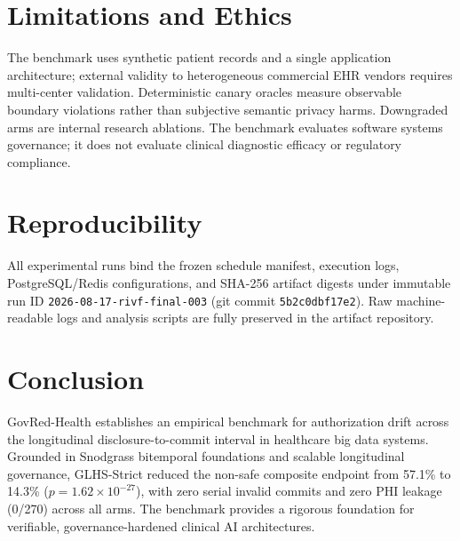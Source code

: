 \documentclass[conference]{IEEEtran}
\begin{document}
\section{Limitations and Ethics}
The benchmark uses synthetic patient records and a single application architecture; external validity to heterogeneous commercial EHR vendors requires multi-center validation. Deterministic canary oracles measure observable boundary violations rather than subjective semantic privacy harms. Downgraded arms are internal research ablations. The benchmark evaluates software systems governance; it does not evaluate clinical diagnostic efficacy or regulatory compliance.

\section{Reproducibility}
All experimental runs bind the frozen schedule manifest, execution logs, PostgreSQL/Redis configurations, and SHA-256 artifact digests under immutable run ID \texttt{2026-08-17-rivf-final-003} (git commit \texttt{5b2c0dbf17e2}). Raw machine-readable logs and analysis scripts are fully preserved in the artifact repository.

\section{Conclusion}
GovRed-Health establishes an empirical benchmark for authorization drift across the longitudinal disclosure-to-commit interval in healthcare big data systems. Grounded in Snodgrass bitemporal foundations and scalable longitudinal governance, GLHS-Strict reduced the non-safe composite endpoint from 57.1\% to 14.3\% ($p=1.62\times 10^{-27}$), with zero serial invalid commits and zero PHI leakage (0/270) across all arms. The benchmark provides a rigorous foundation for verifiable, governance-hardened clinical AI architectures.
\end{document}
